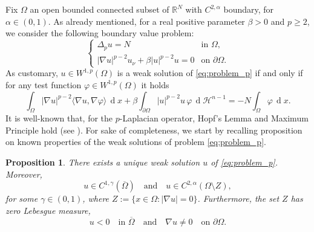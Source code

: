 \documentclass[10pt,a4paper]{amsart}
\numberwithin{equation}{section}
\newcommand{\R}{\mathbb{R}}
\newtheorem{prop}[teo]{Proposition}
\renewcommand{\d}[1]{\ensuremath{\operatorname{d}\!{#1}}}
\begin{document}
Fix $\Omega$ an open bounded connected subset of $\R^N$ with $C^{2,\alpha}$ boundary, for $\alpha \in (0,1)$. As already mentioned, for a real positive parameter $\beta > 0$ and $p\geq2$, we consider the following boundary value problem:
\begin{equation} \label{eq:problem_p}
    \begin{cases}
    \Delta_p u = N & \text{in } \Omega, \\
    |\nabla u|^{p-2} u_\nu + \beta |u|^{p-2}u = 0 & \text{on } \partial\Omega.
    \end{cases}
\end{equation}
As customary, $u\in W^{1,p}(\Omega)$ is a weak solution of \eqref{eq:problem_p} if and only if for any test function $\varphi \in  W^{1,p}(\Omega)$ it holds
\begin{equation*}
    \int_\Omega |\nabla u|^{p-2} \langle \nabla u, \nabla \varphi \rangle \,\d{x} +\beta \int_{\partial\Omega}|u|^{p-2}u\,\varphi\,\d{\mathcal H^{n-1}}
    =-N\int_\Omega \varphi \,\d{x}.
\end{equation*}
It is well-known that, for the $p$-Laplacian operator, Hopf's Lemma and Maximum Principle hold (see \cite[Chapter 5]{PucciSerrin07}). For sake of completeness, we start by recalling  proposition on known properties of the weak solutions of problem \ref{eq:problem_p}. 

\begin{prop}\label{prop properties u}
There exists a unique weak solution $u$ of \eqref{eq:problem_p}. Moreover,
\begin{equation*}
    u \in C^{1,\gamma}(\overline{\Omega}) \quad \text{and} \quad u \in C^{2,\alpha}(\Omega \setminus Z),
\end{equation*}
for some $\gamma \in (0,1)$, where $Z := \{x \in \Omega \colon |\nabla u| = 0\}$.
Furthermore, the set $Z$ has zero Lebesgue measure,
\[
u<0 \quad \text{in } \overline{\Omega} \quad \text{and} \quad
\nabla u \neq 0 \quad \text{on } \partial\Omega.
\]
\end{prop}
\end{document}
